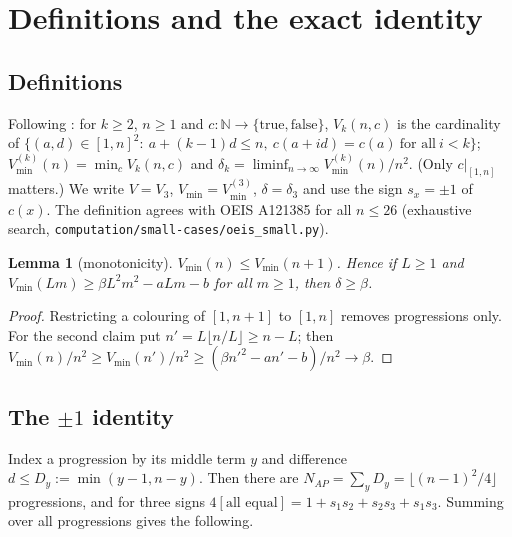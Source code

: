 \documentclass[11pt]{amsart}
\newtheorem{lemma}[theorem]{Lemma}
\theoremstyle{remark}
\newcommand{\N}{\mathbb{N}}
\newcommand{\mono}{V}
\newcommand{\mmin}{V_{\min}}
\begin{document}
\section{Definitions and the exact identity}\label{sec:setup}

\subsection{Definitions}
Following \cite{FC}: for $k\ge2$, $n\ge1$ and $c\colon\N\to\{\text{true},\text{false}\}$, $\mono_k(n,c)$ is the cardinality of
$\{(a,d)\in[1,n]^2:\ a+(k-1)d\le n,\ c(a+id)=c(a)\ \text{for all}\ i<k\}$; $\mmin^{(k)}(n)=\min_c\mono_k(n,c)$ and
$\delta_k=\liminf_{n\to\infty}\mmin^{(k)}(n)/n^2$. (Only $c|_{[1,n]}$ matters.) We write $\mono=\mono_3$, $\mmin=\mmin^{(3)}$, $\delta=\delta_3$ and use the sign
$s_x=\pm1$ of $c(x)$. The definition agrees with OEIS A121385 \cite{OEIS121385} for all $n\le26$ (exhaustive search, \texttt{computation/small-cases/oeis\_small.py}).

\begin{lemma}[monotonicity]\label{lem:mono}
$\mmin(n)\le\mmin(n+1)$. Hence if $L\ge1$ and $\mmin(Lm)\ge\beta L^2m^2-aLm-b$ for all $m\ge1$, then $\delta\ge\beta$.
\end{lemma}
\begin{proof}
Restricting a colouring of $[1,n+1]$ to $[1,n]$ removes progressions only. For the second claim put $n'=L\lfloor n/L\rfloor\ge n-L$; then $\mmin(n)/n^2\ge\mmin(n')/n^2\ge(\beta n'^2-an'-b)/n^2\to\beta$.
\end{proof}

\subsection{The $\pm1$ identity}
Index a progression by its middle term $y$ and difference $d\le D_y:=\min(y-1,n-y)$. Then there are $N_{AP}=\sum_yD_y=\lfloor(n-1)^2/4\rfloor$
progressions, and for three signs $4[\text{all equal}]=1+s_1s_2+s_2s_3+s_1s_3$. Summing over all progressions gives the following.
\end{document}
